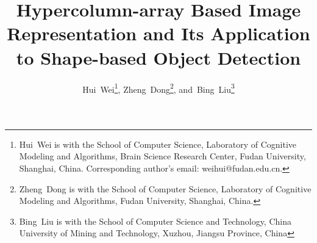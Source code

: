 \documentclass[journal]{IEEEtran}
\begin{document}
\title{Hypercolumn-array Based Image Representation and 
Its Application to Shape-based Object Detection}
\author{Hui~Wei\thanks{Hui~Wei is with the School of Computer Science, 
Laboratory of Cognitive Modeling and Algorithms, 
Brain Science Research Center, Fudan University, Shanghai, China. 
Corresponding author's email: weihui@fudan.edu.cn.},
Zheng~Dong\thanks{Zheng~Dong is with the School of Computer Science, 
Laboratory of Cognitive Modeling and Algorithms, 
Fudan University, Shanghai, China.},
and~Bing~Liu\thanks{Bing~Liu is with the School of Computer Science and Technology,
China University of Mining and Technology, Xuzhou, Jiangsu Province, China}}


\maketitle
\end{document}
